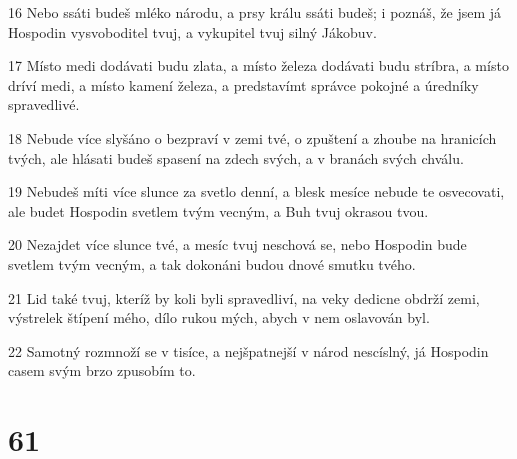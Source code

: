 \par 16 Nebo ssáti budeš mléko národu, a prsy králu ssáti budeš; i poznáš, že jsem já Hospodin vysvoboditel tvuj, a vykupitel tvuj silný Jákobuv.
\par 17 Místo medi dodávati budu zlata, a místo železa dodávati budu stríbra, a místo dríví medi, a místo kamení železa, a predstavímt správce pokojné a úredníky spravedlivé.
\par 18 Nebude více slyšáno o bezpraví v zemi tvé, o zpuštení a zhoube na hranicích tvých, ale hlásati budeš spasení na zdech svých, a v branách svých chválu.
\par 19 Nebudeš míti více slunce za svetlo denní, a blesk mesíce nebude te osvecovati, ale budet Hospodin svetlem tvým vecným, a Buh tvuj okrasou tvou.
\par 20 Nezajdet více slunce tvé, a mesíc tvuj neschová se, nebo Hospodin bude svetlem tvým vecným, a tak dokonáni budou dnové smutku tvého.
\par 21 Lid také tvuj, kteríž by koli byli spravedliví, na veky dedicne obdrží zemi, výstrelek štípení mého, dílo rukou mých, abych v nem oslavován byl.
\par 22 Samotný rozmnoží se v tisíce, a nejšpatnejší v národ nescíslný, já Hospodin casem svým brzo zpusobím to.

\chapter{61}


